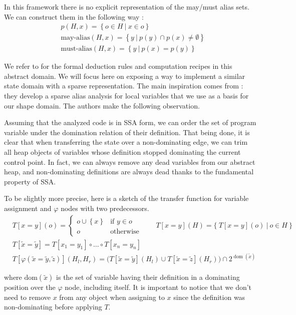 \documentclass[11pt]{article}
\renewcommand{\phi}{\varphi}
\DeclareMathOperator{\dom}{dom}
\begin{document}
In this framework there is no explicit representation of the may/must alias sets.
We can construct them in the following way :
\begin{align*}
& p(H,x) = \left\{ o \in H ~|~ x \in o \right\} \\
& \text{may-alias}(H,x) = \left\{ y~|~ p(y)\cap p(x) \neq \emptyset \right\} \\
& \text{must-alias}(H,x) = \left\{ y~|~ p(x) = p(y) \right\}
\end{align*}

We refer to \cite{ssc} for the formal deduction rules and computation recipes in this abstract domain.
We will focus here on exposing a way to implement a similar state domain with a sparse representation.
The main inspiration comes from \cite{ssa-alias}: they develop a sparse alias analysis for local variables that we use as a basis for our shape domain. The authors make the following observation.

Assuming that the analyzed code is in SSA form, we can order the set of program variable under the domination relation of their definition.
That being done, it is clear that when transferring the state over a non-dominating edge, we can trim all heap objects of variables whose definition stopped dominating the current control point. In fact, we can always remove any dead variables from our abstract heap, and non-dominating definitions are always dead thanks to the fundamental property of SSA.

To be slightly more precise, here is a sketch of the transfer function for variable assignment and $\phi$ nodes with two predecessors.
\[
\begin{aligned}
&T[x=y](o) = \begin{cases}
o \cup \left\{ x \right\} & \text{if } y \in o \\
o & \text{otherwise}
\end{cases}
\qquad
T[x=y](H) = \Big\{~T[x=y](o)~|~o \in H~\Big\} \\
& T[\tilde{x}=\tilde{y}] = T[x_1=y_1]\circ\dots\circ T[x_n=y_n] \\
&T[\phi(\tilde{x}=\tilde{y},\tilde{z})](H_l,H_r) = \big( T[\tilde{x}=\tilde{y}](H_l)\cup T[\tilde{x}=\tilde{z}](H_r) \big)\cap 2^{\dom(\tilde{x})}
\end{aligned}
\]

where $\text{dom}(\tilde{x})$ is the set of variable having their definition in a dominating position over the $\phi$ node, including itself. It is important to notice that we don't need to remove $x$ from any object when assigning to $x$ since the definition was non-dominating before applying $T$.
\end{document}
